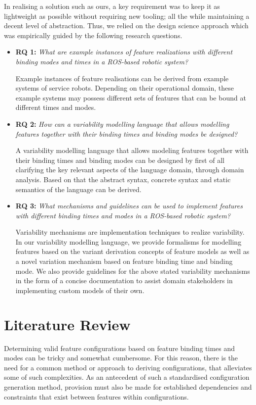 \documentclass[conference]{IEEEtran}
\begin{document}
In realising a solution such as ours, a key requirement was to keep it as lightweight as possible without requiring new tooling; all the while maintaining a decent level of abstraction. Thus, we relied on the design science approach which was empirically guided by the following research questions.
\begin{itemize}
     \item \textbf{RQ 1: }\emph{What are example instances of feature realizations with different binding modes and times in a ROS-based robotic system?}
     
     Example instances of feature realisations can be derived from example systems of service robots. Depending on their operational domain, these example systems may possess different sets of features that can be bound at different times and modes.
    
    \item \textbf{RQ 2: } \emph{How can a variability modelling language that allows modelling features together with their binding times and binding modes be designed?}
    
    A variability modelling language that allows modeling features together with their binding times and binding modes can be designed by first of all clarifying the key relevant aspects of the language domain, through domain analysis. Based on that the abstract syntax, concrete syntax and static semantics of the language can be derived.
    
    \item \textbf{RQ 3:} \emph{What mechanisms and guidelines can be used to implement features with different binding times and modes in a ROS-based robotic system?}
    
    Variability mechanisms are implementation techniques to realize variability. In our variability modelling language, we provide formalisms for modelling features based on the variant derivation concepts of feature models as well as a novel variation mechanism based on feature binding time and binding mode. We also provide guidelines for the above stated variability mechanisms in the form of a concise documentation to assist domain stakeholders in implementing custom models of their own.
\end{itemize}

\section{Literature Review}
Determining valid feature configurations based on feature binding times and modes can be tricky and somewhat cumbersome. For this reason, there is the need for a common method or approach to deriving configurations, that alleviates some of such complexities. As an antecedent of such a standardised configuration generation method, provision must also be made for established dependencies and constraints that exist between features within configurations.
\end{document}
